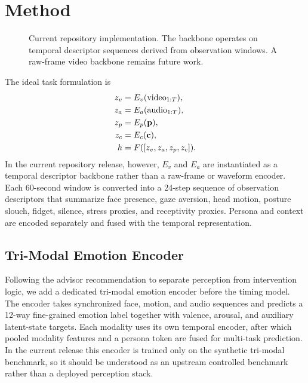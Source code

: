 \section{Method}
\begin{figure}[t]
\centering
{}
\caption{Current repository implementation. The backbone operates on temporal descriptor sequences derived from observation windows. A raw-frame video backbone remains future work.}
\label{fig:method}
\end{figure}

The ideal task formulation is
\begin{align*}
z_v &= E_v(\text{video}_{1:T}), \\
z_a &= E_a(\text{audio}_{1:T}), \\
z_p &= E_p(\mathbf{p}), \\
z_c &= E_c(\mathbf{c}), \\
h &= F([z_v, z_a, z_p, z_c]).
\end{align*}
In the current repository release, however, $E_v$ and $E_a$ are instantiated as a temporal descriptor backbone rather than a raw-frame or waveform encoder. Each 60-second window is converted into a 24-step sequence of observation descriptors that summarize face presence, gaze aversion, head motion, posture slouch, fidget, silence, stress proxies, and receptivity proxies. Persona and context are encoded separately and fused with the temporal representation.

\subsection{Tri-Modal Emotion Encoder}
Following the advisor recommendation to separate perception from intervention logic, we add a dedicated tri-modal emotion encoder before the timing model. The encoder takes synchronized face, motion, and audio sequences and predicts a 12-way fine-grained emotion label together with valence, arousal, and auxiliary latent-state targets. Each modality uses its own temporal encoder, after which pooled modality features and a persona token are fused for multi-task prediction. In the current release this encoder is trained only on the synthetic tri-modal benchmark, so it should be understood as an upstream controlled benchmark rather than a deployed perception stack.

